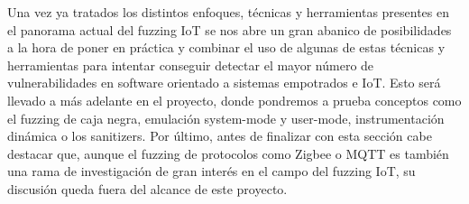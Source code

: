 Una vez ya tratados los distintos enfoques, técnicas y herramientas presentes en el panorama actual del fuzzing IoT se nos abre un gran abanico de 
posibilidades a la hora de poner en práctica y combinar el uso de algunas de estas técnicas y herramientas para intentar conseguir detectar el mayor 
número de vulnerabilidades en software orientado a sistemas empotrados e IoT. Esto será llevado a más adelante en el proyecto, donde pondremos a prueba 
conceptos como el fuzzing de caja negra, emulación system-mode y user-mode, instrumentación dinámica o los sanitizers. Por último, antes de finalizar con
esta sección cabe destacar que, aunque el fuzzing de protocolos como Zigbee o MQTT es también una rama de investigación de gran interés en el campo del
fuzzing IoT, su discusión queda fuera del alcance de este proyecto.

\bigskip
